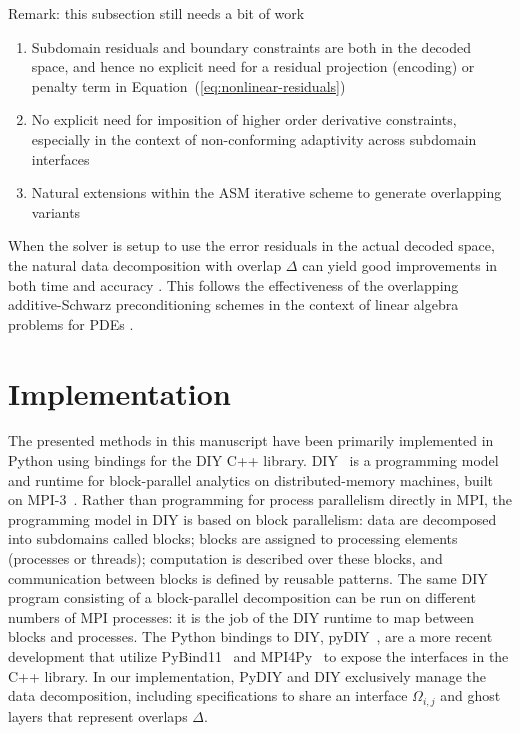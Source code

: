\documentclass[conference]{IEEEtran}
\newcommand{\Remark}[1]{{\color{RED}\sf Remark: {#1}}}
\newcommand{\eqt}[1]{Equation~(\ref{#1})}
\begin{document}
\Remark{this subsection still needs a bit of work}

\begin{enumerate}
	\item Subdomain residuals and boundary constraints are both in the decoded space, and hence no explicit need for a residual projection (encoding) or penalty term in \eqt{eq:nonlinear-residuals}
	\item No explicit need for imposition of higher order derivative constraints, especially in the context of non-conforming adaptivity across subdomain interfaces
	\item Natural extensions within the ASM iterative scheme to generate overlapping variants
\end{enumerate}


When the solver is setup to use the error residuals in the actual decoded space, the natural data decomposition with overlap $\Delta$ can yield good improvements in both time and accuracy \cite{bjorstad-overlap-1989}. This follows the effectiveness of the overlapping additive-Schwarz preconditioning schemes in the context of linear algebra problems for PDEs \cite{smith-ddm} \cite{gander-rasm}. 



\section{Implementation}
\label{sec:implementation}

The presented methods in this manuscript have been primarily implemented in Python using bindings for the DIY C++ library. DIY~\cite{morozov16} is a programming model and runtime
for block-parallel analytics on distributed-memory machines, built on MPI-3~\cite{dongarra13}.  Rather than programming
for process parallelism directly in MPI, the programming model in DIY is based on block parallelism: data are decomposed
into subdomains called blocks; blocks are assigned to processing elements (processes or threads); computation is
described over these blocks, and communication between blocks is defined by reusable patterns. The same DIY program
consisting of a block-parallel decomposition can be run on different numbers of MPI processes: it is the job of the DIY
runtime to map between blocks and processes. The Python bindings to DIY, pyDIY~\cite{pydiy},
are a more recent development that utilize PyBind11~\cite{jakob17} and MPI4Py~\cite{dalcin11} to expose the interfaces in the C++ library. In our implementation, PyDIY and DIY exclusively manage the data decomposition, including specifications to share an interface $\Omega_{i,j}$ and ghost layers that represent overlaps $\Delta$.
\end{document}

